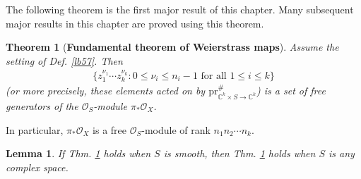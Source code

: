 \documentclass[12pt,b5paper,notitlepage]{report}
\theoremstyle{definition}
\theoremstyle{plain}
\newtheorem{thm}[df]{Theorem}
\newtheorem{lm}[df]{Lemma}
\newcommand{\scr}{\mathscr}
\newcommand{\Cbb}{\mathbb C}
\newcommand{\pr}{\mathrm {pr}}
\numberwithin{equation}{section}
\begin{document}
The following theorem is the first major result of this chapter. Many subsequent major results in this chapter are proved using this theorem.

\begin{thm}[\textbf{Fundamental theorem of Weierstrass maps}]\label{lb60}
Assume the setting of Def. \ref{lb57}. Then
\begin{align}\label{eq32}
\{z_1^{\nu_1}\cdots z_k^{\nu_k}:0\leq \nu_i\leq n_i-1\text{ for all }1\leq i\leq k\}
\end{align}
(or more precisely, these elements acted on by $\pr_{\Cbb^k\times S\rightarrow \Cbb^k}^\#$) is a set of free generators of the $\scr O_S$-module $\pi_*\scr O_X$.
\end{thm}

In particular, $\pi_*\scr O_X$ is a free $\scr O_S$-module of rank $n_1n_2\cdots n_k$.



\begin{lm}\label{lb92}
If Thm. \ref{lb60} holds when $S$ is smooth, then Thm. \ref{lb60} holds when $S$ is any complex space.
\end{lm}
\end{document}
